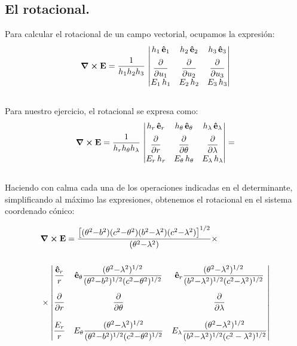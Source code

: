 \subsection*{El rotacional.}

Para calcular el rotacional de un campo vectorial, ocupamos la expresión:
\begin{align*}
\curl{\vb{E}} = \dfrac{1}{h_{1} h_{2} h_{3}} \, \mdet{
h_{1} \, \vu{e}_{1} & h_{2} \, \vu{e}_{2} & h_{3} \, \vu{e}_{3} \\[0.5em]
\displaystyle \pdv{u_{1}} & \displaystyle \pdv{u_{2}} & \displaystyle \pdv{u_{3}} \\[0.5em]
E_{1} \, h_{1} & E_{2} \, h_{2} & E_{3} \, h_{3}
}
\end{align*}
\\
Para nuestro ejercicio, el rotacional se expresa como:
\begin{align*}
\curl{\vb{E}} = \dfrac{1}{h_{r} h_{\theta} h_{\lambda}} \, \mdet{
h_{r} \, \vu{e}_{r} & h_{\theta} \, \vu{e}_{\theta} & h_{\lambda} \, \vu{e}_{\lambda} \\[0.5em]
\displaystyle \pdv{r} & \displaystyle \pdv{\theta} & \displaystyle \pdv{\lambda} \\[0.5em]
E_{r} \, h_{r} & E_{\theta} \, h_{\theta} & E_{\lambda} \, h_{\lambda}
} = 
\end{align*}
\\
Haciendo con calma cada una de los operaciones indicadas en el determinante, simplificando al máximo las expresiones, obtenemos el rotacional en el sistema coordenado cónico:

\begin{align*}
&\curl{\vb{E}} = \dfrac{\big[ (\theta^{2} {-} b^{2}) (c^{2} {-} \theta^{2}) (b^{2} {-} \lambda^{2}) (c^{2} {-} \lambda^{2}) \big]^{1/2}}{(\theta^{2} {-} \lambda^{2})} \times \\[1.5em]
&\times \mqty| \dfrac{\vu{e}_{r}}{r} & \vu{e}_{\theta} \dfrac{(\theta^{2} {-} \lambda^{2})^{1/2}}{(\theta^{2} {-} b^{2})^{1/2} (c^{2} {-} \theta^{2})^{1/2}} & \vu{e}_{r} \dfrac{(\theta^{2} {-} \lambda^{2})^{1/2}}{(b^{2} {-} \lambda^{2})^{1/2} (c^{2} {-} \lambda^{2})^{1/2}} \\[1.5em]
\displaystyle \pdv{r} & \displaystyle \pdv{\theta} & \displaystyle \pdv{\lambda} \\[1.5em]
\dfrac{E_{r}}{r} & E_{\theta} \dfrac{(\theta^{2} {-} \lambda^{2})^{1/2}}{(\theta^{2} {-} b^{2})^{1/2} (c^{2} {-} \theta^{2})^{1/2}} & E_{\lambda} \dfrac{(\theta^{2} {-} \lambda^{2})^{1/2}}{(b^{2} {-} \lambda^{2})^{1/2} (c^{2} - \lambda^{2})^{1/2}}
|
\end{align*}

